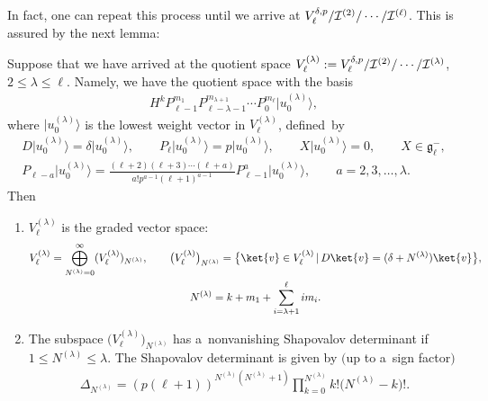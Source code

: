 \documentclass[pdftex]{sigma}
\numberwithin{equation}{section}
\begin{document}
In fact, one can repeat this process until we arrive at $ V^{\delta,p}_{\ell}/{\cal I}^{(2)}/\cdots/{\cal I}^{(\ell)}$.
This is assured by the next lemma:
\begin{lemma}
\label{lemma5}
Suppose that we have arrived at the quotient space $ V_{\ell}^{(\lambda)}:= V^{\delta,p}_{\ell}/{\cal
I}^{(2)}/\cdots/{\cal I}^{(\lambda)}$, $2 \leq \lambda \leq \ell$.
Namely, we have the quotient space with the basis
\begin{gather*}
H^k P_{\ell-1}^{m_1} P_{\ell-\lambda-1}^{m_{\lambda+1}} \cdots P_0^{m_{\ell}} \big|u_0^{(\lambda)}\big\rangle ,
\end{gather*}
where $ \big|u_0^{(\lambda)}\big\rangle  $ is the lowest weight vector in $ V_{\ell}^{(\lambda)} $, defined~by
\begin{gather}
    D \big|u_0^{(\lambda)}\big\rangle  = \delta \big|u_0^{(\lambda)}\big\rangle ,
\qquad
P_{\ell} \big|u_0^{(\lambda)}\big\rangle  = p \big|u_0^{(\lambda)}\big\rangle ,
\qquad
X \big|u_0^{(\lambda)}\big\rangle  = 0, \qquad X \in {\mathfrak g}_{\ell}^-,
\nonumber
\\      P_{\ell-a} \big|u_0^{(\lambda)}\big\rangle  = \frac{(\ell+2) (\ell+3) \cdots (\ell+a)}{a!   p^{a-1}   (\ell+1)^{a-1}}
P_{\ell-1}^a \big|u_0^{(\lambda)}\big\rangle ,
\qquad
a = 2, 3, \dots, \lambda.
\label{Assumption-lambda}
\end{gather}
Then
\begin{enumerate}\itemsep=0pt
\item[$i)$] $ V_{\ell}^{(\lambda)} $ is the graded vector space:
\begin{gather*}
    V_{\ell}^{(\lambda)} = \bigoplus_{N^{(\lambda)}=0}^{\infty} (V_{\ell}^{(\lambda)})_{N^{(\lambda)}},
\qquad
\big(V_{\ell}^{(\lambda)}\big)_{N^{(\lambda)}} = \big\{ \ket{v} \in V_{\ell}^{(\lambda)} \, | \, D \ket{v} = (\delta +
N^{(\lambda)}) \ket{v} \big\},
\nonumber
\\
    N^{(\lambda)} = k + m_1 + \sum\limits_{i=\lambda+1}^{\ell} i m_i.
\end{gather*}
\item[$ii)$] The subspace $ \big(V_{\ell}^{(\lambda)}\big)_{N^{(\lambda)}} $ has a~nonvanishing Shapovalov determinant if $ 1 \leq
N^{(\lambda)} \leq \lambda$.
The Shapovalov determinant is given by $($up to a~sign factor$)$
\begin{gather}
\Delta_{N^{(\lambda)}} = (p  (\ell+1))^{N^{(\lambda)}(N^{(\lambda)}+1)} \prod\limits_{k=0}^{N^{(\lambda)}} k!
\big(N^{(\lambda)}-k\big)!.
\label{KDinQuotient}

\end{gather}
\end{enumerate}
\end{lemma}
\end{document}
